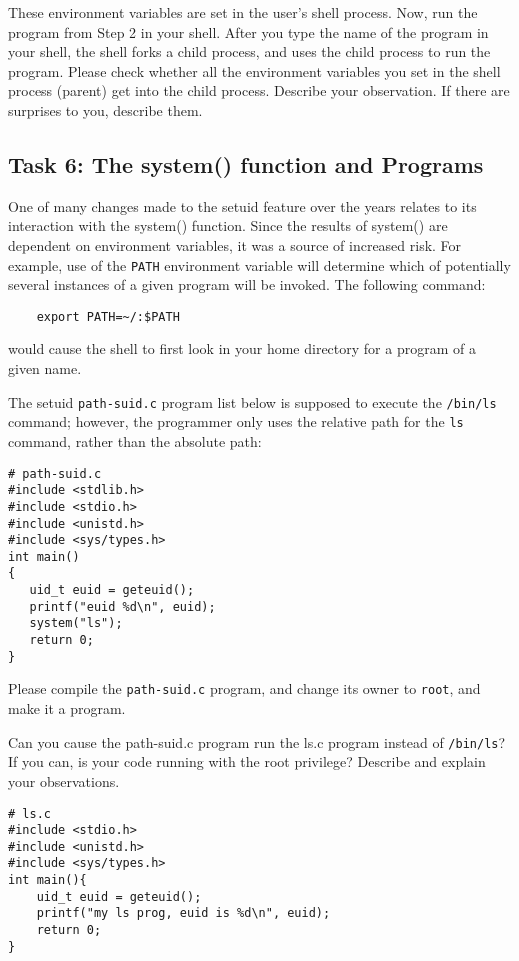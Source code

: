 These environment variables are set in the user's shell process.
Now, run the \setuid program from Step 2 in your shell. After you type the
name of the program in your shell, the shell forks a child process,
and uses the child process to run the program. Please check whether all the
environment variables you set in the shell process (parent) get into
the \setuid child process.  Describe your observation. If there are 
surprises to you, describe them.  



\subsection{Task 6: The system() function and \setuid Programs}
One of many changes made to the setuid feature over the years relates
to its interaction with the system() function.  Since the results
of system() are dependent on environment variables, it was a source
of increased risk.  For example, use of the {\tt PATH} environment
variable will determine which of potentially several instances of a
given program will be invoked.  The following command:
\begin{verbatim}
    export PATH=~/:$PATH
\end{verbatim}
\noindent would cause the shell to first look in your home directory for a program
of a given name.

The setuid {\tt path-suid.c} program list below is supposed to execute the {\tt /bin/ls} command; 
however, the programmer only uses the relative path for the {\tt ls} 
command, rather than the absolute path:

\begin{Verbatim}[frame=single] 
# path-suid.c
#include <stdlib.h>
#include <stdio.h>
#include <unistd.h>
#include <sys/types.h>
int main()
{
   uid_t euid = geteuid();
   printf("euid %d\n", euid);
   system("ls");
   return 0;
}
\end{Verbatim}

Please compile the {\tt path-suid.c} program, and change its owner to {\tt root}, and 
make it a \setuid program.  

Can you cause the path-suid.c \setuid program run the ls.c program instead of 
{\tt /bin/ls}?  If you can, is your code running with the root privilege?
Describe and explain your observations. 
\begin{Verbatim}[frame=single] 
# ls.c
#include <stdio.h>
#include <unistd.h>
#include <sys/types.h>
int main(){
    uid_t euid = geteuid();
    printf("my ls prog, euid is %d\n", euid);
    return 0;
}
\end{Verbatim}



